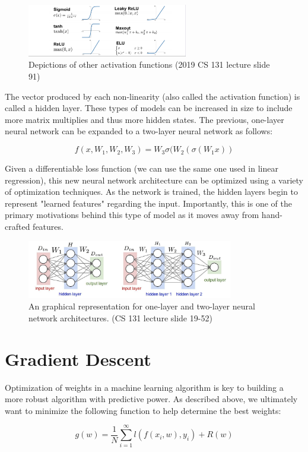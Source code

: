 ﻿\documentclass{article}
\begin{document}
\begin{figure}[h]
\includegraphics[width=7cm]{activation_functions2.PNG}
\centering
\caption{Depictions of other activation functions (2019 CS 131 lecture slide 91)}
\end{figure}

The vector produced by each non-linearity (also called the activation function) is called a hidden layer. These types of models can be increased in size to include more matrix multiplies and thus more hidden states. The previous, one-layer neural network can be expanded to a two-layer neural network as follows:

$$f(x,W_1,W_2,W_3) = W_3\sigma(W_2(\sigma(W_1x))$$ 

Given a differentiable loss function (we can use the same one used in linear regression), this new neural network architecture can be optimized using a variety of optimization techniques. As the network is trained, the hidden layers begin to represent "learned features" regarding the input. Importantly, this is one of the primary motivations behind this type of model as it moves away from hand-crafted features.

\begin{figure}[h]
\includegraphics[width=9cm]{neural_network.png}
\centering
\caption{An graphical representation for one-layer and two-layer neural network architectures. (CS 131 lecture slide 19-52)}
\end{figure}

\section{Gradient Descent}
Optimization of weights in a machine learning algorithm is key to building a more robust algorithm with predictive power. As described above, we ultimately want to minimize the following function to help determine the best weights:

$$ g(w) = \frac{1}{N} \sum_{i=1}^{\infty} l(f(x_i, w), y_i) + R(w)$$
\end{document}
